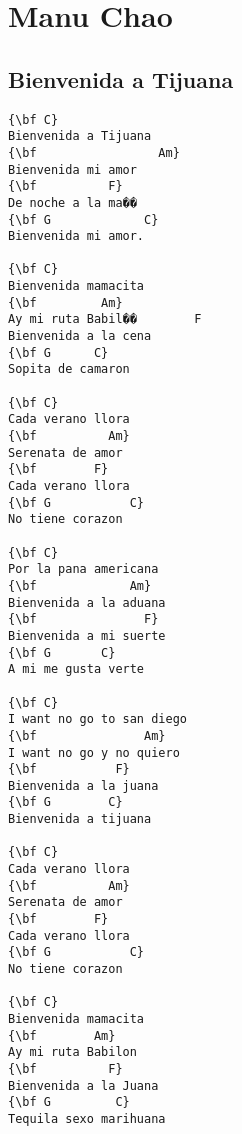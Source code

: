 \documentclass[a4paper]{article}
\begin{document}
\newpage
\section{Manu Chao} %
\label{sec:Manu Chao}
\subsection{Bienvenida a Tijuana} %
\label{sub:Bienvenida a Tiju}
\begin{multicols}{2}
\begin{Verbatim}[commandchars=\\\{\}]
{\bf C}
Bienvenida a Tijuana
{\bf                 Am}
Bienvenida mi amor
{\bf 		  F}
De noche a la ma��
{\bf G             C}
Bienvenida mi amor. 

{\bf C}
Bienvenida mamacita
{\bf 		 Am}
Ay mi ruta Babil��		  F
Bienvenida a la cena 
{\bf G		C}
Sopita de camaron

{\bf C}
Cada verano llora
{\bf 	      Am}
Serenata de amor
{\bf 		F}
Cada verano llora
{\bf G           C}
No tiene corazon

{\bf C}
Por la pana americana
{\bf 		     Am}
Bienvenida a la aduana
{\bf 		       F}
Bienvenida a mi suerte 
{\bf G		 C}
A mi me gusta verte

{\bf C}
I want no go to san diego
{\bf 		       Am}
I want no go y no quiero
{\bf 		   F}
Bienvenida a la juana 
{\bf G		  C}
Bienvenida a tijuana

{\bf C}
Cada verano llora
{\bf 	      Am}
Serenata de amor
{\bf 		F}
Cada verano llora
{\bf G           C}
No tiene corazon

{\bf C}
Bienvenida mamacita
{\bf 		Am}
Ay mi ruta Babilon
{\bf 		  F}
Bienvenida a la Juana 
{\bf G		   C}
Tequila sexo marihuana
\end{Verbatim}
\end{multicols}
\newpage
\end{document}
